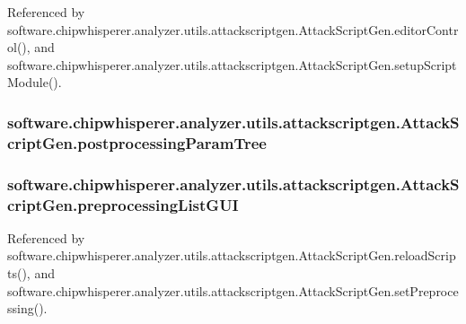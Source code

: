 Referenced by software.\+chipwhisperer.\+analyzer.\+utils.\+attackscriptgen.\+Attack\+Script\+Gen.\+editor\+Control(), and software.\+chipwhisperer.\+analyzer.\+utils.\+attackscriptgen.\+Attack\+Script\+Gen.\+setup\+Script\+Module().

\hypertarget{classsoftware_1_1chipwhisperer_1_1analyzer_1_1utils_1_1attackscriptgen_1_1AttackScriptGen_aad9d740d3ff9f9272ee30f2b9fb5a63c}{}
\subsubsection[{postprocessing\+Param\+Tree}]{\setlength{\rightskip}{0pt plus 5cm}software.\+chipwhisperer.\+analyzer.\+utils.\+attackscriptgen.\+Attack\+Script\+Gen.\+postprocessing\+Param\+Tree}\label{classsoftware_1_1chipwhisperer_1_1analyzer_1_1utils_1_1attackscriptgen_1_1AttackScriptGen_aad9d740d3ff9f9272ee30f2b9fb5a63c}
\hypertarget{classsoftware_1_1chipwhisperer_1_1analyzer_1_1utils_1_1attackscriptgen_1_1AttackScriptGen_a2a42def4f16bc00d2233121aa2c3ba1f}{}
\subsubsection[{preprocessing\+List\+G\+U\+I}]{\setlength{\rightskip}{0pt plus 5cm}software.\+chipwhisperer.\+analyzer.\+utils.\+attackscriptgen.\+Attack\+Script\+Gen.\+preprocessing\+List\+G\+U\+I}\label{classsoftware_1_1chipwhisperer_1_1analyzer_1_1utils_1_1attackscriptgen_1_1AttackScriptGen_a2a42def4f16bc00d2233121aa2c3ba1f}


Referenced by software.\+chipwhisperer.\+analyzer.\+utils.\+attackscriptgen.\+Attack\+Script\+Gen.\+reload\+Scripts(), and software.\+chipwhisperer.\+analyzer.\+utils.\+attackscriptgen.\+Attack\+Script\+Gen.\+set\+Preprocessing().

